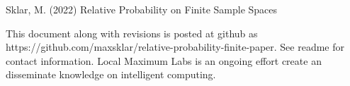 \documentclass[twoside]{article}
\theoremstyle{plain}%
\theoremstyle{definition}
\theoremstyle{remark}
\begin{document}
\begin{thebibliography}{20}

Sklar, M. (2022) Relative Probability on Finite Sample Spaces

\end{thebibliography}

This document along with revisions is posted at github as https://github.com/maxsklar/relative-probability-finite-paper. See readme for contact information. Local Maximum Labs is an ongoing effort create an disseminate knowledge on intelligent computing.
\end{document}
